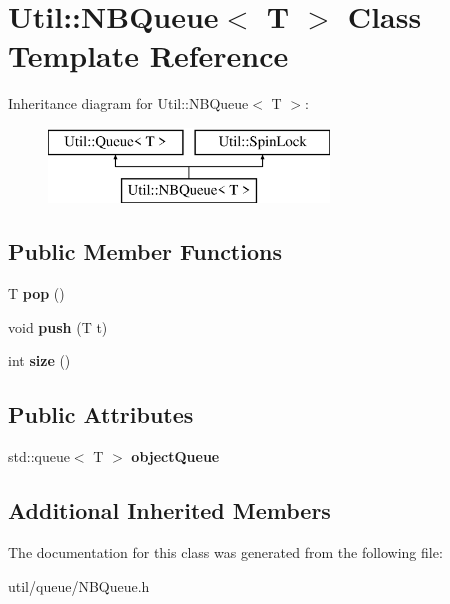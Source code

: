 \hypertarget{class_util_1_1_n_b_queue}{}\section{Util\+:\+:N\+B\+Queue$<$ T $>$ Class Template Reference}
\label{class_util_1_1_n_b_queue}
Inheritance diagram for Util\+:\+:N\+B\+Queue$<$ T $>$\+:\begin{figure}[H]
\begin{center}
\leavevmode
\includegraphics[height=2.000000cm]{class_util_1_1_n_b_queue}
\end{center}
\end{figure}
\subsection*{Public Member Functions}
\begin{DoxyCompactItemize}
\item 
\mbox{\label{class_util_1_1_n_b_queue_a6e5c795a78408bdc90b22b063d19bf05}} 
T {\bfseries pop} ()
\item 
\mbox{\label{class_util_1_1_n_b_queue_a80e0acaf08e1aff29624310c26080d08}} 
void {\bfseries push} (T t)
\item 
\mbox{\label{class_util_1_1_n_b_queue_a9c6d5bc11f1ce6f946e77ca680c02e28}} 
int {\bfseries size} ()
\end{DoxyCompactItemize}
\subsection*{Public Attributes}
\begin{DoxyCompactItemize}
\item 
\mbox{\label{class_util_1_1_n_b_queue_adb5b1aa5336d83df053fd4912b16e739}} 
std\+::queue$<$ T $>$ {\bfseries object\+Queue}
\end{DoxyCompactItemize}
\subsection*{Additional Inherited Members}


The documentation for this class was generated from the following file\+:\begin{DoxyCompactItemize}
\item 
util/queue/N\+B\+Queue.\+h\end{DoxyCompactItemize}
